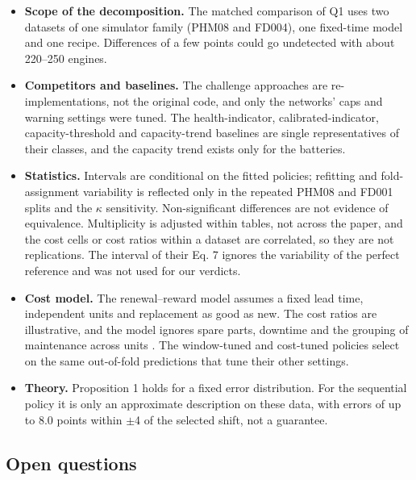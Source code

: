 \documentclass[a4paper,fleqn,doubleblind]{cas-dc}
\begin{document}
\begin{itemize}[leftmargin=1.2em,itemsep=2pt]
\item \textbf{Scope of the decomposition.} The matched comparison of Q1 uses two datasets of one simulator family (PHM08 and FD004), one fixed-time model and one recipe. Differences of a few points could go undetected with about 220--250 engines.
\item \textbf{Competitors and baselines.} The challenge approaches are re-implementations, not the original code, and only the networks' caps and warning settings were tuned. The health-indicator, calibrated-indicator, capacity-threshold and capacity-trend baselines are single representatives of their classes, and the capacity trend exists only for the batteries.
\item \textbf{Statistics.} Intervals are conditional on the fitted policies; refitting and fold-assignment variability is reflected only in the repeated PHM08 and FD001 splits and the $\kappa$ sensitivity. Non-significant differences are not evidence of equivalence. Multiplicity is adjusted within tables, not across the paper, and the cost cells or cost ratios within a dataset are correlated, so they are not replications. The interval of their Eq. 7 ignores the variability of the perfect reference and was not used for our verdicts.
\item \textbf{Cost model.} The renewal--reward model assumes a fixed lead time, independent units and replacement as good as new. The cost ratios are illustrative, and the model ignores spare parts, downtime and the grouping of maintenance across units \cite{depater2022,mitici2023}. The window-tuned and cost-tuned policies select on the same out-of-fold predictions that tune their other settings.
\item \textbf{Theory.} Proposition 1 holds for a fixed error distribution. For the sequential policy it is only an approximate description on these data, with errors of up to 8.0 points within $\pm$4 of the selected shift, not a guarantee.
\end{itemize}

\subsection{Open questions}
\end{document}
